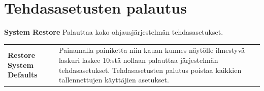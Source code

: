 \documentclass[12pt,a4paper,finnish]{uvmanual}
\begin{document}
\section{Tehdasasetusten palautus}\label{ch:system_restore}

\textbf{System Restore} Palauttaa koko ohjausjärjestelmän tehdasasetukset.


\begin{tabular}{ L{0.2\textwidth} L{0.66\textwidth} }
\textbf{Restore System Defaults} & Painamalla painiketta niin kauan kunnes näytölle ilmestyvä laskuri laskee 10:stä nollaan palauttaa järjestelmän tehdasasetukset. Tehdasasetusten palutus poistaa kaikkien tallennettujen käyttäjien asetukset. \\
\end{tabular}
\end{document}
